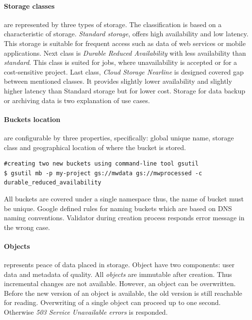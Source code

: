 \documentclass[a4paper,12pt,oneside]{report}
\begin{document}
\paragraph{Storage classes} are represented by three types of storage. The classification is based 
on a characteristic of storage. \textit{Standard storage}, offers high availability and low 
latency. This storage is suitable for frequent access such 
as data of web services or mobile applications.
Next class is \textit{Durable Reduced Availability} with less availability than  \textit{standard}. 
This class is suited for jobs, where unavailability is accepted or for a cost-sensitive project. 
Last class, \textit{Cloud Storage Nearline} is designed 
covered gap between mentioned classes. It provides slightly lower availability and slightly higher 
latency than Standard storage but for lower cost. 
Storage for data backup or archiving data is two explanation of use cases.

\paragraph{Buckets location} are configurable by three properties, specifically: global unique 
name, storage class and geographical location of where the bucket is stored.

\begin{footnotesize}\begin{lstlisting}[style=mybash]
#creating two new buckets using command-line tool gsutil
$ gsutil mb -p my-project gs://mwdata gs://mwprocessed -c durable_reduced_availability
\end{lstlisting}\end{footnotesize}
 

All buckets are covered under a single namespace thus, the name of bucket must be unique. 
Google defined rules for naming buckets which are based on DNS naming conventions. Validator 
during creation process responds error message in the wrong case. 

\paragraph{Objects} represents peace of data placed in storage. Object have two components: 
user data and metadata of quality. All \textit{objects} are immutable after creation. Thus 
incremental changes are not available. However, an object 
can be overwritten. Before the new version of an object is available, the old version is still 
reachable for reading. Overwriting of a single object 
can proceed up to one second. Otherwise \textit{503 Service Unavailable errors} is responded.
\end{document}
